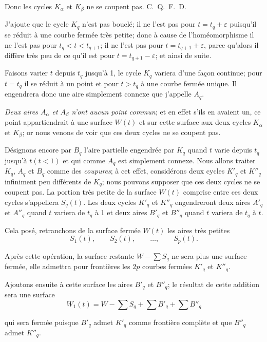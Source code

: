 \documentclass{article}
\begin{document}
Donc les cycles $K_{\alpha}$ et $K_{\beta}$ ne se coupent pas. C.~Q.~F.~D.

J'ajoute que le cycle $K_{q}$ n'est pas bouclé; il ne l'est pas pour $t = t_{q} + \varepsilon$ puisqu'il se réduit à une courbe fermée très petite; donc à cause de l'homéomorphisme il ne l'est pas pour $t_{q} < t < t_{q+1}$; il ne l'est pas pour $t = t_{q+1} + \varepsilon$, parce qu'alors il diffère très peu de ce qu'il est pour $t = t_{q+1} - \varepsilon$; et ainsi de suite.

Faisons varier $t$ depuis $t_{q}$ jusqu'à 1, le cycle $K_{q}$ variera d'une façon continue; pour $t = t_{q}$ il se réduit à un point et pour $t > t_{q}$ à une courbe fermée unique. Il engendrera donc une aire simplement connexe que j'appelle $A_{q}$.

\emph{Deux aires $A_{\alpha}$ et $A_{\beta}$ n'ont aucun point commun}; et en effet s'ils en avaient un, ce point appartiendrait à une surface $W(t)$ et sur cette surface aux deux cycles $K_{\alpha}$ et $K_{\beta}$; or nous venons de voir que ces deux cycles ne se coupent pas.

Désignons encore par $B_{q}$ l'aire partielle engendrée par $K_{q}$ quand $t$ varie depuis $t_{q}$ jusqu'à $t (t < 1)$ et qui comme $A_{q}$ est simplement connexe. Nous allons traiter $K_{q}$, $A_{q}$ et $B_{q}$ comme des \emph{coupures}; à cet effet, considérons deux cycles $K'_{q}$ et $K''_{q}$ infiniment peu différents de $K_{q}$; nous pouvons supposer que ces deux cycles ne se coupent pas. La portion très petite de la surface $W(t)$ comprise entre ces deux cycles s'appellera $S_{q}(t)$. Les deux cycles $K'_{q}$ et $K''_{q}$ engendreront deux aires $A'_{q}$ et $A''_{q}$ quand $t$ variera de $t_{q}$ à 1 et deux aires $B'_{q}$ et $B''_{q}$ quand $t$ variera de $t_{q}$ à $t$.

Cela posé, retranchons de la surface fermée $W(t)$ les aires très petites
\[ S_{1}(t), \qquad S_{2}(t), \qquad \ldots, \qquad S_{p}(t). \]

Après cette opération, la surface restante $W - \displaystyle\sum S_{q}$ ne sera plus une surface fermée, elle admettra pour frontières les $2p$ courbes fermées $K'_{q}$ et $K''_{q}$.

Ajoutons ensuite à cette surface les aires $B'_{q}$ et $B''_{q}$; le résultat de cette addition sera une surface
\[ W_{1}(t) = W - \sum S_{q} + \sum B'_{q} + \sum B''_{q} \]

qui sera fermée puisque $B'_{q}$ admet $K'_{q}$ comme frontière complète et que $B''_{q}$ admet $K''_{q}$.
\end{document}
